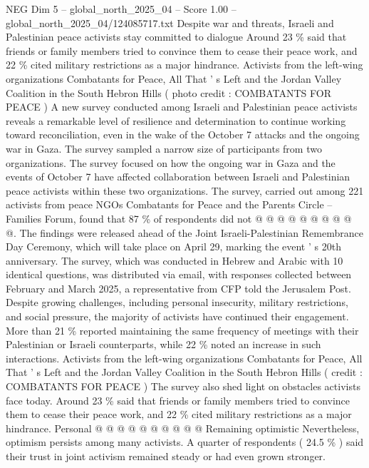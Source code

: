 \begin{textsample}{NEG Dim 5 – global\_north\_2025\_04 – Score 1.00 – global\_north\_2025\_04/124085717.txt}  \label{ex:f5_neg_368}
Despite war and threats, Israeli and Palestinian peace activists stay committed to dialogue Around 23 \% said that friends or family members tried to convince them to cease their peace work, and 22 \% cited military restrictions as a major hindrance.
Activists from the left-wing organizations Combatants for Peace, All That ' s Left and the Jordan Valley Coalition in the South Hebron Hills ( photo credit : COMBATANTS FOR PEACE ) A new survey conducted among Israeli and Palestinian peace activists reveals a remarkable level of resilience and determination to continue working toward reconciliation, even in the wake of the October 7 attacks and the ongoing war in Gaza.
The survey sampled a narrow size of participants from two organizations.
The survey focused on how the ongoing war in Gaza and the events of October 7 have affected collaboration between Israeli and Palestinian peace activists within these two organizations.
The survey, carried out among 221 activists from peace NGOs Combatants for Peace and the Parents Circle -- Families Forum, found that 87 \% of respondents did not @ @ @ @ @ @ @ @ @ @.
The findings were released ahead of the Joint Israeli-Palestinian Remembrance Day Ceremony, which will take place on April 29, marking the event ' s 20th anniversary.
The survey, which was conducted in Hebrew and Arabic with 10 identical questions, was distributed via email, with responses collected between February and March 2025, a representative from CFP told the Jerusalem Post.
Despite growing challenges, including personal insecurity, military restrictions, and social pressure, the majority of activists have continued their engagement.
More than 21 \% reported maintaining the same frequency of meetings with their Palestinian or Israeli counterparts, while 22 \% noted an increase in such interactions.
Activists from the left-wing organizations Combatants for Peace, All That ' s Left and the Jordan Valley Coalition in the South Hebron Hills ( credit : COMBATANTS FOR PEACE ) The survey also shed light on obstacles activists face today.
Around 23 \% said that friends or family members tried to convince them to cease their peace work, and 22 \% cited military restrictions as a major hindrance.
Personal @ @ @ @ @ @ @ @ @ @ Remaining optimistic Nevertheless, optimism persists among many activists.
A quarter of respondents ( 24.5 \% ) said their trust in joint activism remained steady or had even grown stronger.

\end{textsample}

